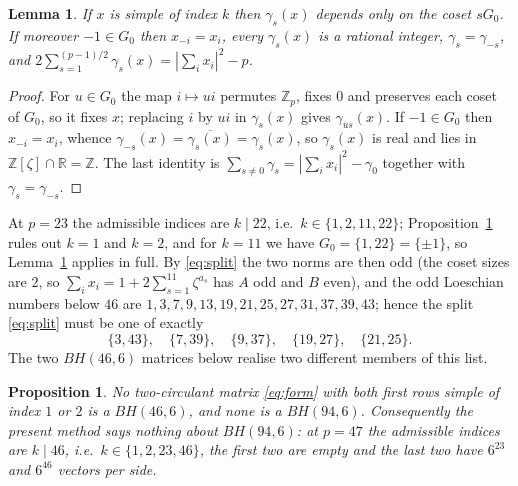 \documentclass[11pt]{amsart}
\newtheorem{lemma}[theorem]{Lemma}
\newtheorem{proposition}[theorem]{Proposition}
\theoremstyle{remark}
\newcommand{\zzz}{\zeta}
\begin{document}
\begin{lemma}\label{lem:coset}
If $x$ is simple of index $k$ then $\gamma_s(x)$ depends only on the coset
$sG_0$. If moreover $-1\in G_0$ then $x_{-i}=x_i$, every $\gamma_s(x)$ is a
rational integer, $\gamma_s=\gamma_{-s}$, and
$2\sum_{s=1}^{(p-1)/2}\gamma_s(x)=|\sum_ix_i|^{2}-p$.
\end{lemma}

\begin{proof}
For $u\in G_0$ the map $i\mapsto ui$ permutes $\mathbb Z_p$, fixes $0$ and
preserves each coset of $G_0$, so it fixes $x$; replacing $i$ by $ui$ in
$\gamma_s(x)$ gives $\gamma_{us}(x)$. If $-1\in G_0$ then $x_{-i}=x_i$,
whence $\gamma_{-s}(x)=\overline{\gamma_s(x)}=\gamma_s(x)$, so $\gamma_s(x)$
is real and lies in $\mathbb Z[\zzz]\cap\mathbb R=\mathbb Z$. The last
identity is $\sum_{s\ne0}\gamma_s=|\sum_ix_i|^{2}-\gamma_0$ together with
$\gamma_s=\gamma_{-s}$.
\end{proof}

At $p=23$ the admissible indices are $k\mid22$, i.e.\ $k\in\{1,2,11,22\}$;
Proposition~\ref{prop:empty} rules out $k=1$ and $k=2$, and for $k=11$ we
have $G_0=\{1,22\}=\{\pm1\}$, so Lemma~\ref{lem:coset} applies in full.
By \eqref{eq:split} the two norms are then odd (the coset sizes are $2$, so
$\sum_ix_i=1+2\sum_{s=1}^{11}\zzz^{a_s}$ has $A$ odd and $B$ even), and the
odd Loeschian numbers below $46$ are
$1,3,7,9,13,19,21,25,27,31,37,39,43$; hence the split \eqref{eq:split} must
be one of exactly
\[
 \{3,43\},\quad\{7,39\},\quad\{9,37\},\quad\{19,27\},\quad\{21,25\}.
\]
The two $BH(46,6)$ matrices below realise two different members of this
list.

\begin{proposition}\label{prop:empty}
No two-circulant matrix \eqref{eq:form} with both first rows simple of index
$1$ or $2$ is a $BH(46,6)$, and none is a $BH(94,6)$. Consequently the
present method says nothing about $BH(94,6)$: at $p=47$ the admissible
indices are $k\mid46$, i.e.\ $k\in\{1,2,23,46\}$, the first two are empty
and the last two have $6^{23}$ and $6^{46}$ vectors per side.
\end{proposition}
\end{document}
